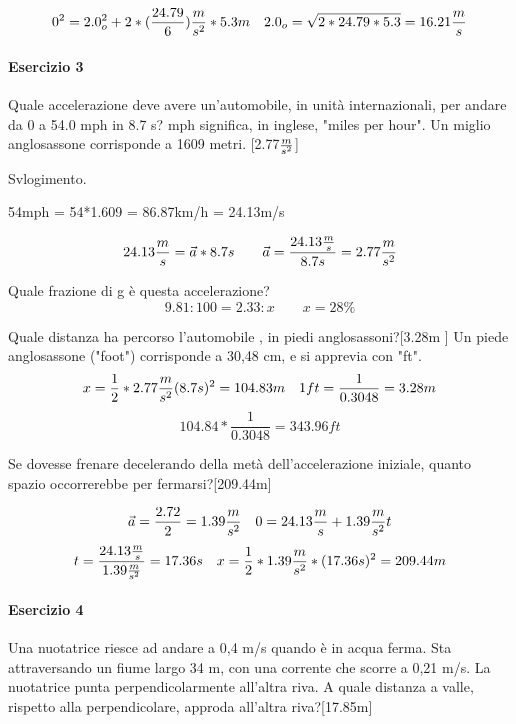 
\begin{equation*}
    0^2 = 2.0_o ^2 + 2*(\frac{24.79}{6})\frac{m}{s^2}*5.3m \quad 2.0_o = \sqrt{2*24.79*5.3} = 16.21\frac{m}{s}
\end{equation*}


\paragraph{Esercizio 3}
Quale accelerazione deve avere un'automobile, in unità internazionali, per andare da 0 a 54.0 mph in 8.7 s?
mph significa, in inglese, "miles per hour". Un miglio anglosassone corrisponde a 1609 metri. [2.77$\frac{m}{s^2}$]

Svlogimento.

54mph = 54*1.609 = 86.87km/h = 24.13m/s

\begin{equation*}
    24.13\frac{m}{s} = \vec{a}*8.7s \qquad{} \vec{a} = \frac{24.13\frac{m}{s}}{8.7s} = 2.77\frac{m}{s^2}
\end{equation*}

Quale frazione di g è questa accelerazione?
\begin{equation*}
    9.81:100 = 2.33:x\qquad{} x = 28\%
\end{equation*}

Quale distanza ha percorso l'automobile , in piedi anglosassoni?[3.28m ]
Un piede anglosassone ("foot") corrisponde a 30,48 cm, e si apprevia con "ft".
\begin{equation*}
    x = \frac{1}{2}*2.77\frac{m}{s^2}(8.7s)^2 = 104.83m \quad{} 1ft = \frac{1}{0.3048} = 3.28m 
\end{equation*}
\begin{equation*}
    104.84*\frac{1}{0.3048} = 343.96ft
\end{equation*}

Se dovesse frenare decelerando della metà dell'accelerazione iniziale, quanto spazio occorrerebbe per fermarsi?[209.44m]

\begin{equation*}
    \vec{a} = \frac{2.72}{2} = 1.39\frac{m}{s^2} \quad 0 = 24.13\frac{m}{s} + 1.39\frac{m}{s^2} t
\end{equation*}
\begin{equation*}
    t = \frac{24.13\frac{m}{s}}{1.39\frac{m}{s^2}} = 17.36s\quad x = \frac{1}{2}*1.39\frac{m}{s^2}*(17.36s)^2 = 209.44m
\end{equation*}

\paragraph{Esercizio 4}
Una nuotatrice riesce ad andare a 0,4 m/s quando è in acqua ferma. Sta attraversando  un fiume largo 34 m, con una corrente che scorre a 0,21 m/s. La nuotatrice punta perpendicolarmente all'altra riva.
A quale distanza a valle, rispetto alla perpendicolare, approda all'altra riva?[17.85m] 

